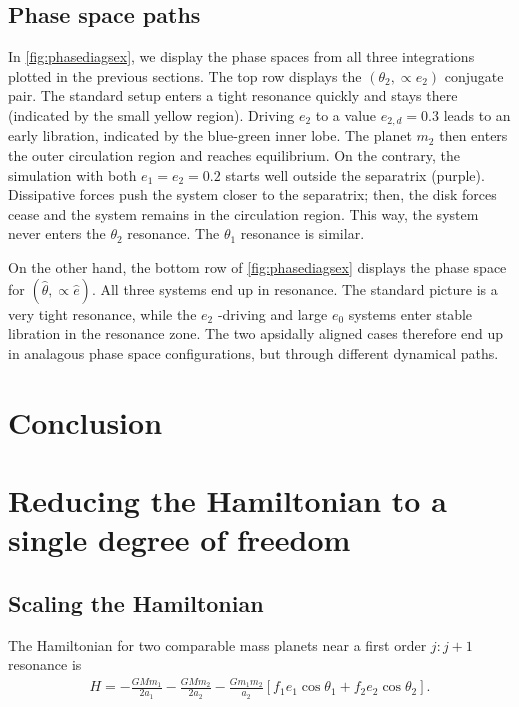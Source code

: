 \documentclass[usenatbib]{mnras}
\begin{document}
\subsection{Phase space paths}
\label{sec:orga46b971}
\begin{figure*}
  \centering
  \texttt{[image: \{./relative-geometry]}.png}
  \caption{ }
  \label{fig:relgeom}
\end{figure*}
In \ref{fig:phasediagsex}, we display the phase spaces from all three
integrations plotted in the previous sections.
The top row displays the \((\theta_2, \propto e_2)\) conjugate pair.
The standard setup enters a tight resonance quickly and stays there (indicated by the small yellow region).
Driving \(e_2\) to a value \(e_{2,d}=0.3\) leads to an early libration, indicated by the blue-green inner lobe.
The planet \(m_2\) then enters the outer circulation region and reaches equilibrium.
On the contrary, the simulation with both \(e_1 = e_2 = 0.2\) starts well outside the separatrix (purple).
Dissipative forces push the system closer to the separatrix; then, the disk forces cease
and the system remains in the circulation region. This way, the system never enters the \(\theta_2\)
resonance. The \(\theta_1\) resonance is similar.

On the other hand, the bottom row of \ref{fig:phasediagsex} displays the
phase space for \((\hat\theta,\propto \hat e)\).
All three systems end up in resonance. The standard picture is a very tight resonance, while the
\(e_2\) -driving and large \(e_0\) systems enter stable libration in the resonance zone.
The two apsidally aligned cases therefore end up in analagous phase space configurations, but
through different dynamical paths.

\section{Conclusion}
\label{sec:orge6def69}

\clearpage

\onecolumn
\appendix
\section{Reducing the Hamiltonian to a single degree of freedom}
\label{sec:org4e752d9}
\subsection{Scaling the Hamiltonian}
\label{sec:org383f86b}
The Hamiltonian for two comparable mass planets near a first order \(j:j+1\)
resonance is
\begin{align}
  H = -\frac{G M m_{1}}{2 a_{1}}-\frac{G M m_{2}}{2 a_{2}}
                 -\frac{G m_{1} m_{2}}{a_{2}}
                  \left[
                  f_{1} e_{1} \cos \theta_{1} 
                  +f_{2} e_{2} \cos \theta_{2}\right].
\end{align}
\end{document}
